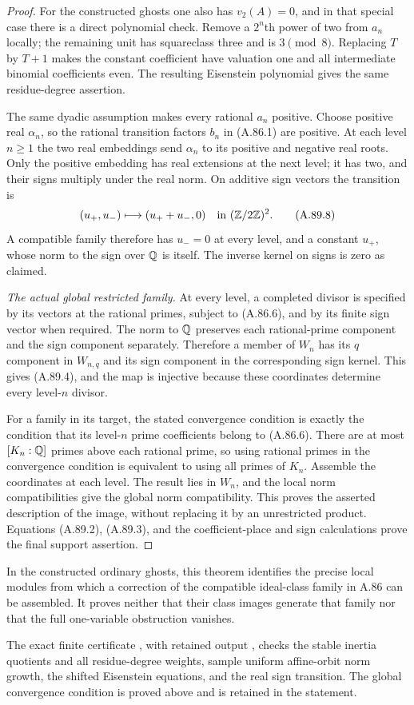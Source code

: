 \begin{proof}
For the constructed ghosts one also has $v_2(A)=0$,
and in that special case there is a direct polynomial
check.  Remove a $2^n$th power of two from $a_n$ locally;
the remaining unit has squareclass three and is
$3\pmod8$.  Replacing $T$ by $T+1$ makes the constant
coefficient have valuation one and all intermediate
binomial coefficients even.  The resulting Eisenstein
polynomial gives the same residue-degree assertion.

The same dyadic assumption makes every rational $a_n$
positive.  Choose positive real $\alpha_n$, so the rational
transition factors $b_n$ in (A.86.1) are positive.
At each level $n\ge1$ the two real embeddings send
$\alpha_n$ to its positive and negative real roots.
Only the positive embedding has real extensions at the
next level; it has two, and their signs multiply under
the real norm.  On additive sign vectors the transition is
\[
                (u_+,u_-)\longmapsto(u_++u_-,0)
                       \quad\text{in }(\mathbb Z/2\mathbb Z)^2.
 \tag{A.89.8}
\]
A compatible family therefore has $u_-=0$ at every level,
and a constant $u_+$, whose norm to the sign over $\mathbb Q$
is itself.  The inverse kernel on signs is zero as claimed.

\emph{The actual global restricted family.}
At every level, a completed divisor is specified by its
vectors at the rational primes, subject to (A.86.6), and
by its finite sign vector when required.
The norm to $\mathbb Q$ preserves each rational-prime component
and the sign component separately.  Therefore a member
of $W_n$ has its $q$ component in $W_{n,q}$ and its sign
component in the corresponding sign kernel.
This gives (A.89.4), and the map is injective because
these coordinates determine every level-$n$ divisor.

For a family in its target, the stated convergence
condition is exactly the condition that its level-$n$
prime coefficients belong to (A.86.6).
There are at most $[K_n:\mathbb Q]$ primes above each rational
prime, so using rational primes in the convergence
condition is equivalent to using all primes of $K_n$.
Assemble the coordinates at each level.  The result lies
in $W_n$, and the local norm compatibilities give the
global norm compatibility.  This proves the asserted
description of the image, without replacing it by an
unrestricted product.  Equations (A.89.2), (A.89.3), and
the coefficient-place and sign calculations prove the
final support assertion.
\end{proof}

In the constructed ordinary ghosts, this theorem identifies
the precise local modules from which a correction of the
compatible ideal-class family in A.86 can be assembled.
It proves neither that their class images generate that
family nor that the full one-variable obstruction vanishes.

\noindent The exact finite certificate
, with retained output
, checks the
stable inertia quotients and all residue-degree weights, sample
uniform affine-orbit norm growth, the shifted Eisenstein equations,
and the real sign transition.  The global convergence condition
is proved above and is retained in the statement.
